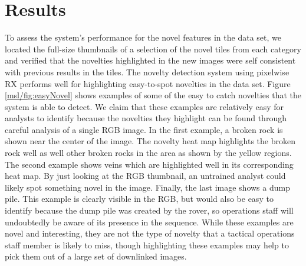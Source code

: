 \section{Results}
To assess the system's performance for the novel features in the \cite{kerner_data} data set, we located the full-size thumbnails of a selection of the novel tiles from each category and verified that the novelties highlighted in the new images were self consistent with previous results in the tiles. 
The novelty detection system using pixelwise RX performs well for highlighting easy-to-spot novelties in the data set. 
Figure \ref{msl/fig:easyNovel} shows examples of some of the easy to catch novelties that the system is able to detect. 
We claim that these examples are relatively easy for analysts to identify because the novelties they highlight can be found through careful analysis of a single RGB image.
In the first example, a broken rock is shown near the center of the image.
The novelty heat map highlights the broken rock well as well other broken rocks in the area as shown by the yellow regions.
The second example shows veins which are highlighted well in its corresponding heat map. 
By just looking at the RGB thumbnail, an untrained analyst could likely spot something novel in the image. 
Finally, the last image shows a dump pile.
This example is clearly visible in the RGB, but would also be easy to identify because the dump pile was created by the rover, so operations staff will undoubtedly be aware of its presence in the sequence. 
While these examples are novel and interesting, they are not the type of novelty that a tactical operations staff member is likely to miss, though highlighting these examples may help to pick them out of a large set of downlinked images. 

